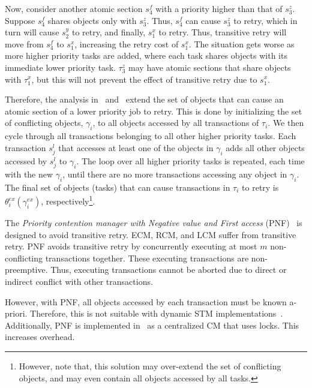\documentclass[prodmode,acmtecs]{acmsmall}
\begin{document}
Now, consider another atomic section $s_4^f$ with a priority higher than that of $s_3^z$. Suppose $s_4^f$ shares objects only with $s_3^z$. Thus, $s_4^f$ can cause $s_3^z$ to retry, which in turn will cause $s_2^y$ to retry, and finally, $s_1^x$ to retry. Thus, transitive retry will move from $s_{4}^{f}$ to $s_{1}^{x}$, increasing the retry cost of $s_{1}^{x}$. The situation gets worse as more higher priority tasks are added, where each task shares objects with its immediate lower priority task. $\tau_{3}^{z}$ may have atomic sections that share objects with $\tau_{1}^{x}$,
but this will not prevent the effect of transitive retry due to $s_{1}^{x}$.



Therefore, the analysis in~\cite{stmconcurrencycontrol:emsoft11} and~\cite{lcmdac2012} extend the set of objects that can cause an atomic section of a lower priority job to retry.  This is done by initializing the set of conflicting objects, $\gamma_i$, to all objects accessed by all transactions of $\tau_i$. We then cycle through all transactions belonging to all other higher priority tasks. Each transaction $s_j^l$ that accesses at least one of the objects in $\gamma_i$ adds all other objects accessed by $s_j^l$ to $\gamma_i$. The loop over all higher priority tasks is repeated, each time with the new $\gamma_i$, until there are no more transactions accessing any object in $\gamma_i$. The final set of objects (tasks) that can cause transactions in $\tau_i$ to retry is $\theta_i^{ex}(\gamma_i^{ex})$, respectively\footnote{However, note that, this solution may over-extend the set of conflicting objects, and may even contain all objects accessed by all tasks.}. 

The \textit{Priority contention manager with Negative value and First access} (PNF)~\cite{shambake_phd_proposal} is designed to avoid transitive retry. ECM, RCM, and LCM suffer from transitive retry. PNF avoids transitive retry by concurrently executing at most $m$ non-conflicting transactions together. These executing transactions are non-preemptive. Thus, executing transactions cannot be aborted due to direct or indirect conflict with other transactions.

However, with PNF, all objects accessed by each transaction must be known a-priori. Therefore, this is not suitable with dynamic STM implementations~\cite{Herlihy:2003:STM:872035.872048}. Additionally, PNF is implemented in~\cite{shambake_phd_proposal} as a centralized CM that uses locks. This increases overhead. 
\end{document}
